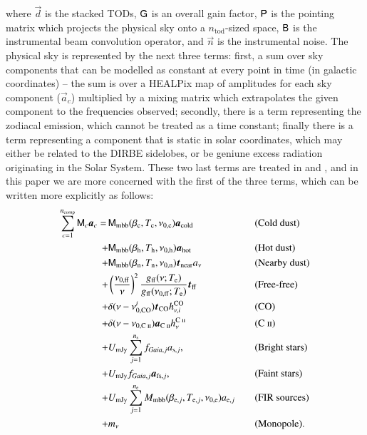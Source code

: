 \documentclass{aa}
\newcommand{\mathsc}[1]{{\normalfont\textsc{#1}}}
\renewcommand{\P}[0]{\tens{P}}
\newcommand{\G}[0]{\tens{G}}
\newcommand{\B}[0]{\tens{B}}
\renewcommand{\a}[0]{\vec{a}}
\newcommand{\n}[0]{\vec{n}}
\renewcommand{\t}[0]{\vec{t}}
\newcommand{\dv}[0]{\vec{d}}
\newcommand{\M}[0]{\tens{M}}
\newcommand{\cii}{\ensuremath{\mathsc {C\ ii}}}
\def\Tcold{\ifmmode T_\mathrm{c}\else $T_{\mathrm{c}}$\fi}
\def\Thot{\ifmmode T_\mathrm{h}\else $T_{\mathrm{h}}$\fi}
\def\Tnear{\ifmmode T_\mathrm{n}\else $T_{\mathrm{n}}$\fi}
\def\bcold{\ifmmode \beta_\mathrm{c}\else $\beta_{\mathrm{c}}$\fi}
\def\bhot{\ifmmode \beta_\mathrm{h}\else $\beta_{\mathrm{h}}$\fi}
\def\bnear{\ifmmode \beta_\mathrm{n}\else $\beta_{\mathrm{n}}$\fi}
\def\nuzeroff{\ifmmode \nu_{0,\mathrm{ff}}\else $\nu_{0,\mathrm{ff}}$\fi}
\def\nuzerocold{\ifmmode \nu_{0,\mathrm{c}}\else $\nu_{0,\mathrm{c}}$\fi}
\def\nuzerohot{\ifmmode \nu_{0,\mathrm{h}}\else $\nu_{0,\mathrm{h}}$\fi}
\def\nuzeronear{\ifmmode \nu_{0,\mathrm{n}}\else $\nu_{0,\mathrm{n}}$\fi}
\def\Te{\ifmmode T_{\mathrm{e}}\else $T_{\mathrm{e}}$\fi}
\begin{document}
where $\dv$ is the stacked TODs, $\G$ is an overall gain factor, $\P$ is the
pointing matrix which projects the physical sky onto a $n_{\mathrm{tod}}$-sized
space, $\B$ is the instrumental beam convolution operator, and $\n$ is the
instrumental noise. The physical sky is represented by the next three terms:
first, a sum over sky components that can be modelled as constant at every
point in time (in galactic coordinates) -- the sum is over a HEALPix map of
amplitudes for each sky component ($\a_c$) multiplied by a mixing matrix which
extrapolates the given component to the frequencies observed; secondly, there
is a term representing the zodiacal emission, which cannot be treated as a time
constant; finally there is a term representing a component that is static in
solar coordinates, which may either be related to the DIRBE sidelobes, or be
geniune excess radiation originating in the Solar System. These two last terms
are treated in \citet{CG02_02} and \citet{CG02_03}, and in this paper we are more concerned with the first of the three terms, which can be written more explicitly as follows:
\begin{equation}
\label{eq:skymodel}
\begin{aligned}
  \sum_{c=1}^{n_{\mathrm{comp}}} \M_c \a_c  = \,
  &\M_{\mathrm{mbb}}(\bcold,\Tcold,\nuzerocold)\vec{a}_{\mathrm{cold}}
  && \textrm{(Cold dust)} \\
  + &\M_{\mathrm{mbb}}(\bhot,\Thot,\nuzerohot)
  \vec{a}_{\mathrm{hot}} && \textrm{(Hot dust)}\\
  + &\M_{\mathrm{mbb}}(\bnear,\Tnear,\nuzeronear) \t_{\mathrm{near}}
  a_{\nu} && \textrm{(Nearby dust)} \\
  + &\left(\frac{\nuzeroff}{\nu}\right)^2
  \frac{g_{\mathrm{ff}}(\nu;\Te) }{g_{\mathrm{ff}}(\nuzeroff;\Te)}
  \vec{t}_{\mathrm{ff}} && \textrm{(Free-free)} \\
  + &\delta(\nu-\nu_{0,\mathrm{CO}}^i) \t_{\mathrm{CO}}
  h^{\mathrm{CO}}_{\nu,i} && \textrm{(CO)}\\
  + &\delta(\nu-\nu_{0,\cii}) \a_{\cii}
	h^{\cii}_{\nu} && (\cii)\\
  + &U_{\mathrm{mJy}} \sum_{j=1}^{n_{\mathrm{s}}}
  f_{\mathit{Gaia},j} a_{\mathrm{s},j}, &\quad&
  \textrm{(Bright stars)} \\
  + &U_{\mathrm{mJy}} f_{\mathit{Gaia},j} \a_{\mathrm{fs},j}, &\quad&
  \textrm{(Faint stars)} \\  
    + &U_{\mathrm{mJy}} \sum_{j=1}^{n_{\mathrm{e}}}
  M_{\mathrm{mbb}}(\beta_{\mathrm{e},j},
  T_{\mathrm{e},j}, \nu_{0,\mathrm{e}})
  a_{\mathrm{e},j} && \textrm{(FIR sources)}\\
  + &m_{\nu} && \textrm{(Monopole)}. 
\end{aligned}
\end{equation}
\end{document}
